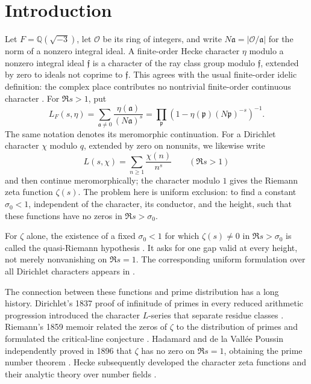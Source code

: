\section{Introduction}\label{sec:introduction}

Let $F=\mathbb Q(\sqrt{-3})$, let $\mathcal O$ be its ring of integers,
and write $N\mathfrak a=|\mathcal O/\mathfrak a|$ for the norm of a
nonzero integral ideal. A finite-order Hecke character $\eta$ modulo
a nonzero integral ideal $\mathfrak f$ is a character of the ray class group
modulo $\mathfrak f$, extended by zero to ideals not coprime to $\mathfrak f$.
This agrees with the usual finite-order idelic definition: the complex
place contributes no nontrivial finite-order continuous character
\cite[Chapter VI, Section 1]{MilneCFT}. For $\Re s>1$, put
\[
 L_F(s,\eta)=\sum_{\mathfrak a\ne0}
       \frac{\eta(\mathfrak a)}{(N\mathfrak a)^s}
 =\prod_{\mathfrak p}
       \left(1-\eta(\mathfrak p)(N\mathfrak p)^{-s}\right)^{-1}.
\]
The same notation denotes its meromorphic continuation. For a
Dirichlet character $\chi$ modulo $q$, extended by zero on nonunits, we
likewise write
\[
 L(s,\chi)=\sum_{n\ge1}\frac{\chi(n)}{n^s}
 \qquad(\Re s>1)
\]
and then continue meromorphically; the character modulo $1$ gives the
Riemann zeta function $\zeta(s)$. The problem here is uniform exclusion:
to find a constant $\sigma_0<1$, independent of the character, its
conductor, and the height, such that these functions have no zeros in
$\Re s>\sigma_0$.

For $\zeta$ alone, the existence of a fixed $\sigma_0<1$ for which
$\zeta(s)\ne0$ in $\Re s>\sigma_0$ is called the quasi-Riemann
hypothesis \cite[Section 1]{BCSS}. It asks for one gap valid at every
height, not merely nonvanishing on $\Re s=1$. The corresponding uniform
formulation over all Dirichlet characters appears in
\cite[p.~288, Equation (1.4) and the following paragraph]{FG}.

The connection between these functions and prime distribution has a
long history. Dirichlet's 1837 proof of infinitude of primes in every
reduced arithmetic progression introduced the character $L$-series
that separate residue classes \cite{Dirichlet}. Riemann's 1859 memoir
related the zeros of $\zeta$ to the distribution of primes and formulated
the critical-line conjecture \cite{Riemann}. Hadamard and de la
Vall\'ee Poussin independently proved in 1896 that $\zeta$ has no zero
on $\Re s=1$, obtaining the prime number theorem
\cite{Hadamard,ValleePoussin}. Hecke subsequently developed the
character zeta functions and their analytic theory over number fields
\cite{Hecke}.


